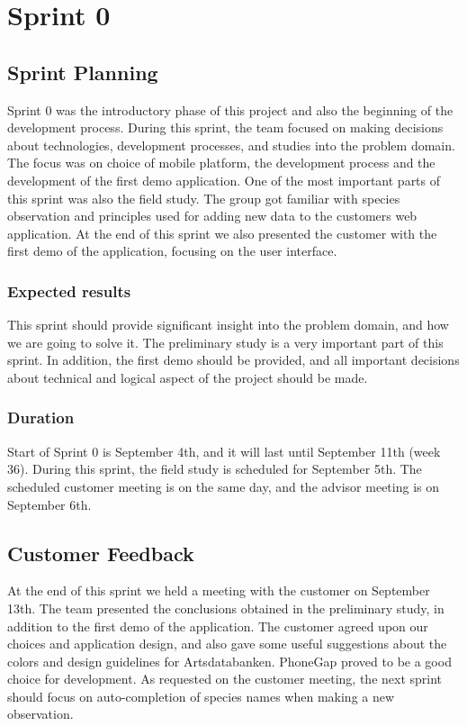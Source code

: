 \section{Sprint 0}

\subsection{Sprint Planning}
	Sprint 0 was the introductory phase of this project and also the beginning of the development process. During this sprint, the team focused on making decisions about technologies, development processes, and studies into the problem domain. The focus was on choice of mobile platform, the development process and the development of the first demo application. One of the most important parts of this sprint was also the field study. The group got familiar with species observation and principles used for adding new data to the customers web application.\newline
  At the end of this sprint we also presented the customer with the first demo of the application, focusing on the user interface.
	
	\subsubsection{Expected results}
	This sprint should provide significant insight into the problem domain, and how we are going to solve it. The preliminary study is a very important part of this sprint. In addition, the first demo should be provided, and all important decisions about technical and logical aspect of the project should be made.
	
	\subsubsection{Duration}
	Start of Sprint 0 is September 4th, and it will last until September 11th (week 36). During this sprint, the field study is scheduled for September 5th. The scheduled customer meeting is on the same day, and the advisor meeting is on September 6th.
	
	
	
\subsection{Customer Feedback}
	At the end of this sprint we held a meeting with the customer on September 13th. The team presented the conclusions obtained in the preliminary study, in addition to the first demo of the application. The customer agreed upon our choices and application design, and also gave some useful suggestions about the colors and design guidelines for Artsdatabanken. PhoneGap proved to be a good choice for development.
As requested on the customer meeting, the next sprint should focus on auto-completion of species names when making a new observation.
	
